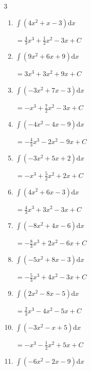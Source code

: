 \begin{multicols}{3}
\begin{enumerate}
  \item $\displaystyle \int \left( 4x^{2}+x-3 \right) \mathrm{d}x$

        $\displaystyle =\frac{4}{3}x^{3}+\frac{1}{2}x^{2}-3x+ C$

  \item $\displaystyle \int \left( 9x^{2}+6x+9 \right) \mathrm{d}x$

        $\displaystyle =3x^{3}+3x^{2}+9x+ C$

  \item $\displaystyle \int \left( -3x^{2}+7x-3 \right) \mathrm{d}x$

        $\displaystyle =-x^{3}+\frac{7}{2}x^{2}-3x+ C$

  \item $\displaystyle \int \left( -4x^{2}-4x-9 \right) \mathrm{d}x$

        $\displaystyle =-\frac{4}{3}x^{3}-2x^{2}-9x+ C$

  \item $\displaystyle \int \left( -3x^{2}+5x+2 \right) \mathrm{d}x$

        $\displaystyle =-x^{3}+\frac{5}{2}x^{2}+2x+ C$

  \item $\displaystyle \int \left( 4x^{2}+6x-3 \right) \mathrm{d}x$

        $\displaystyle =\frac{4}{3}x^{3}+3x^{2}-3x+ C$

  \item $\displaystyle \int \left( -8x^{2}+4x-6 \right) \mathrm{d}x$

        $\displaystyle =-\frac{8}{3}x^{3}+2x^{2}-6x+ C$

  \item $\displaystyle \int \left( -5x^{2}+8x-3 \right) \mathrm{d}x$

        $\displaystyle =-\frac{5}{3}x^{3}+4x^{2}-3x+ C$

\columnbreak %

  \item $\displaystyle \int \left( 2x^{2}-8x-5 \right) \mathrm{d}x$

        $\displaystyle =\frac{2}{3}x^{3}-4x^{2}-5x+ C$

  \item $\displaystyle \int \left( -3x^{2}-x+5 \right) \mathrm{d}x$

        $\displaystyle =-x^{3}-\frac{1}{2}x^{2}+5x+ C$

  \item $\displaystyle \int \left( -6x^{2}-2x-9 \right) \mathrm{d}x$


\end{enumerate}
\end{multicols}
